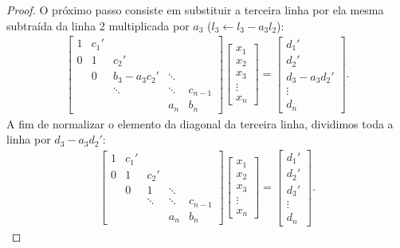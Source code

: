 \begin{proof}
O próximo passo consiste em substituir a terceira linha por ela mesma subtraída da linha 2 multiplicada por $a_3$ ($l_3\leftarrow l_3-a_3l_2$):
\begin{eqnarray} \begin{bmatrix}
   {1} & {c_1'} & {   } & {   } & {   } \\
   {0} & {1} & {c_2'} & {   } & {   } \\
   {   } & { 0 } & {b_3-a_3 c_2'} & \ddots & {   } \\
   {   } & {   } & \ddots & \ddots & {c_{n-1}}\\
   {   } & {   } & {   } & {a_n} & {b_n}
\end{bmatrix}
\begin{bmatrix}
   {x_1 }  \\
   {x_2 }  \\
   {x_3 }  \\
   \vdots   \\
   {x_n }
\end{bmatrix}
=
\begin{bmatrix}
   {d_1' }  \\
   {d_2' }  \\
   {d_3 - a_3d_2'}  \\
   \vdots   \\
   {d_n }
\end{bmatrix}.
\end{eqnarray}
A fim de normalizar o elemento da diagonal da terceira linha, dividimos toda a linha por $d_3 - a_3d_2'$:
\begin{eqnarray} \begin{bmatrix}
   {1} & {c_1'} & {   } & {   } & {   } \\
   {0} & {1} & {c_2'} & {   } & {   } \\
   {   } & { 0 } & {1} & \ddots & {   } \\
   {   } & {   } & \ddots & \ddots & {c_{n-1}}\\
   {   } & {   } & {   } & {a_n} & {b_n}
\end{bmatrix}
\begin{bmatrix}
   {x_1 }  \\
   {x_2 }  \\
   {x_3 }  \\
   \vdots   \\
   {x_n }
\end{bmatrix}
=
\begin{bmatrix}
   {d_1' }  \\
   {d_2' }  \\
   {d_3'}  \\
   \vdots   \\
   {d_n }
\end{bmatrix}.
\end{eqnarray}


\end{proof}
